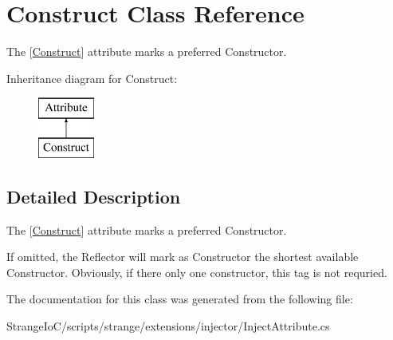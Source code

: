\hypertarget{class_construct}{\section{Construct Class Reference}
\label{class_construct}
}


The {\ttfamily \mbox{[}\hyperlink{class_construct}{Construct}\mbox{]}} attribute marks a preferred Constructor.  


Inheritance diagram for Construct\-:\begin{figure}[H]
\begin{center}
\leavevmode
\includegraphics[height=2.000000cm]{class_construct}
\end{center}
\end{figure}


\subsection{Detailed Description}
The {\ttfamily \mbox{[}\hyperlink{class_construct}{Construct}\mbox{]}} attribute marks a preferred Constructor. 

If omitted, the Reflector will mark as Constructor the shortest available Constructor. Obviously, if there only one constructor, this tag is not requried. 

The documentation for this class was generated from the following file\-:\begin{DoxyCompactItemize}
\item 
Strange\-Io\-C/scripts/strange/extensions/injector/Inject\-Attribute.\-cs\end{DoxyCompactItemize}
